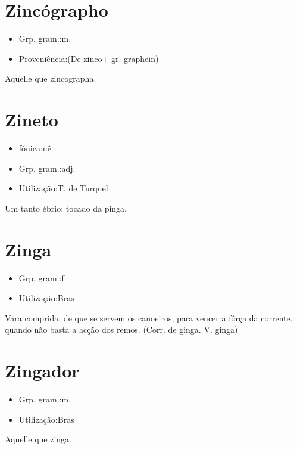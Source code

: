 \section{Zincógrapho}
\begin{itemize}
\item {Grp. gram.:m.}
\end{itemize}
\begin{itemize}
\item {Proveniência:(De \textunderscore zinco\textunderscore  + gr. \textunderscore graphein\textunderscore )}
\end{itemize}
Aquelle que zincographa.
\section{Zineto}
\begin{itemize}
\item {fónica:nê}
\end{itemize}
\begin{itemize}
\item {Grp. gram.:adj.}
\end{itemize}
\begin{itemize}
\item {Utilização:T. de Turquel}
\end{itemize}
Um tanto ébrio; tocado da pinga.
\section{Zinga}
\begin{itemize}
\item {Grp. gram.:f.}
\end{itemize}
\begin{itemize}
\item {Utilização:Bras}
\end{itemize}
Vara comprida, de que se servem os canoeiros, para vencer a fôrça da corrente, quando não basta a acção dos remos.
(Corr. de \textunderscore ginga\textunderscore . V. \textunderscore ginga\textunderscore )
\section{Zingador}
\begin{itemize}
\item {Grp. gram.:m.}
\end{itemize}
\begin{itemize}
\item {Utilização:Bras}
\end{itemize}
Aquelle que zinga.
